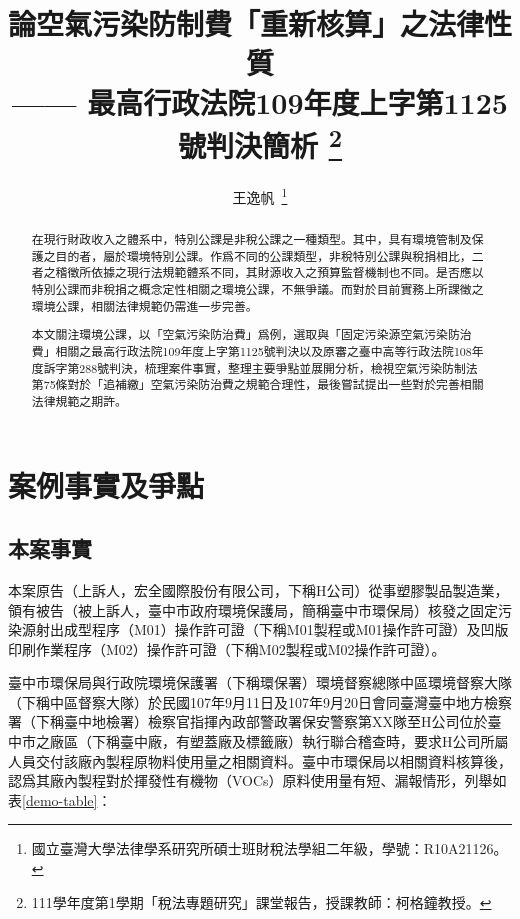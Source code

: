 \documentclass[14pt,a4paper]{article}
\author{王逸帆\,
\thanks{國立臺灣大學法律學系研究所碩士班財稅法學組二年級，學號：R10A21126。}
\vspace{-60em}
}
\date{}
\title{論空氣污染防制費「重新核算」之法律性質\\
\large —— 最高行政法院109年度上字第1125號判決簡析 \thanks{
  111學年度第1學期「稅法專題研究」課堂報告，授課教師：柯格鐘教授。 }}
\begin{document}
\maketitle
\makeatother

\vspace{1pt}

\begin{abstract}
\setlength{\parindent}{2em}
\noindent
\hspace*{0.9\parindent}
在現行財政收入之體系中，特別公課是非稅公課之一種類型。其中，具有環境管制及保護之目的者，屬於環境特別公課。作爲不同的公課類型，非稅特別公課與稅捐相比，二者之稽徵所依據之現行法規範體系不同，其財源收入之預算監督機制也不同。是否應以特別公課而非稅捐之概念定性相關之環境公課，不無爭議。而對於目前實務上所課徵之環境公課，相關法律規範仍需進一步完善。

本文關注環境公課，以「空氣污染防治費」爲例，選取與「固定污染源空氣污染防治費」相關之最高行政法院109年度上字第1125號判決以及原審之臺中高等行政法院108年度訴字第288號判決，梳理案件事實，整理主要爭點並展開分析，檢視空氣污染防制法第75條對於「追補繳」空氣污染防治費之規範合理性，最後嘗試提出一些對於完善相關法律規範之期許。

      \end{abstract}



\thispagestyle{empty} %
\clearpage
    

\tableofcontents 


\thispagestyle{empty} %
\clearpage
\setcounter{page}{1} %










\section{案例事實及爭點}
\subsection{本案事實}

本案原告（上訴人，宏全國際股份有限公司，下稱H公司）從事塑膠製品製造業，領有被告（被上訴人，臺中市政府環境保護局，簡稱臺中市環保局）核發之固定污染源射出成型程序（M01）操作許可證（下稱M01製程或M01操作許可證）及凹版印刷作業程序（M02）操作許可證（下稱M02製程或M02操作許可證）。

臺中市環保局與行政院環境保護署（下稱環保署）環境督察總隊中區環境督察大隊（下稱中區督察大隊）於民國107年9月11日及107年9月20日會同臺灣臺中地方檢察署（下稱臺中地檢署）檢察官指揮內政部警政署保安警察第XX隊至H公司位於臺中市之廠區（下稱臺中廠，有塑蓋廠及標籤廠）執行聯合稽查時，要求H公司所屬人員交付該廠內製程原物料使用量之相關資料。臺中市環保局以相關資料核算後，認爲其廠內製程對於揮發性有機物（VOCs）原料使用量有短、漏報情形，列舉如表\ref{demo-table}：
\end{document}
